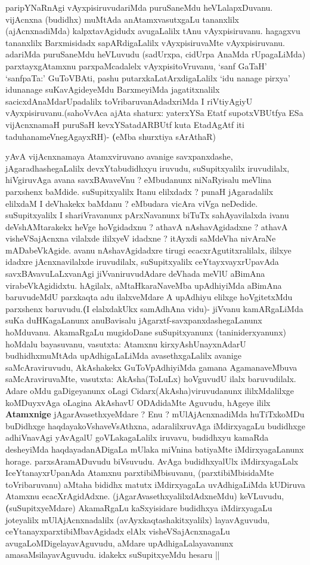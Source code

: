 \begin{artha}
paripYNaRnAgi vAyxpisiruvudariMda puruSaneMdu
heVLalapxDuvanu. vijAcnxna (budidhx) muMtAda anAtamxvasutxgaLu
tananxlilx (ajAcnxnadiMda) kalpxtavAgidudx avugaLalilx tAnu
vAyxpisiruvanu. hagagxvu tananxlilx Barxmisidadx sapARdigaLalilx
vAyxpisiruvaMte vAyxpisiruvanu. adariMda puruSaneMdu heVLuvudu
(sadUrxpa, cidUrpa AnaMda rUpagaLiMda) parxtayxgAtamxnu
parxpaMcadalelx vAyxpisitoVruvanu, `sanf GaTaH' `sanfpaTa:' GuToVBAti,
pashu putarxkaLatArxdigaLalilx `idu nanage pirxya' idunanage
suKavAgideyeMdu BarxmeyiMda jagatitxnalilx sacicxdAnaMdarUpadalilx
toVribaruvanAdadxriMda I riVtiyAgiyU vAyxpisiruvanu.(sahoVvAca ajAta
shaturx: yaterxYSa Etatf supotxV\s BUtfya ESa vijAcnxnamaH puruSaH
kevxYSatadARBUtf kuta EtadAgAtf iti taduhanameVnegAgayxRH)-
\textbf(eMba shurxtiya sArAthaR)
\end{artha}

\begin{artha}
yAvA vijAcnxnamaya Atamxviruvano avanige savxpanxdashe,
jAgaradhashegaLalilx devxYtabudidhxyu iruvudu, suSupitxyalilx
iruvudilalx, hiVgiruvAga avana savxBAvaveVnu ? eMbudanunx niNaRyisalu
meVlina parxshenx baMdide. suSupitxyalilx Itanu elilxdadx ? punaH
jAgaradalilx elilxdaM I deVhakekx baMdanu ? eMbudara vicAra viVga
neDedide. suSupitxyalilx I shariVravanunx pArxNavanunx biTuTx
sahAyavilalxda ivanu deVshAMtarakekx heVge hoVgidadxnu ? athavA
nAshavAgidadxne ? athavA visheVSajAcnxna vilalxde ililxyeV idadxne ?
itAyxdi saMdeVha nivAraNe mADabeVkAgide. avanu nAshavAgidadxre tirugi
ecacxrAgutitxralilalx, ililxye idadxre jAcnxnavilalxde iruvudilalx,
suSupitxyalilx ceYtayxvayxrUpavAda savxBAvavuLaLxvanAgi
jiVvaniruvudAdare deVhada meVlU aBimAna virabeVkAgididxtu. hAgilalx,
aMtaHkaraNaveMba upAdhiyiMda aBimAna baruvudeMdU parxkaqta adu
ilalxveMdare  A upAdhiyu elilxge hoVgitetxMdu parxshenx
baruvudu.\textbf(I elalxdakUkx samAdhAna vidu)- jiVvanu kamARgaLiMda
suKa duHKagaLanunx anuBavisalu jAgarxtf-savxpanxdashegaLanunx
hoMduvanu. AkamaRgaLu mugidoDane suSupitxyanunx (taniniderxyanunx)
hoMdalu bayasuvanu, vasutxta: Atamxnu kirxyAshUnayxnAdarU
budhidhxmuMtAda upAdhigaLaLiMda avasethxgaLalilx avanige
saMcAraviruvudu, AkAshakekx GuToVpAdhiyiMda gamana AgamanaveMbuva
saMcAraviruvaMte, vasutxta: AkAsha(ToLuLx) hoVguvudU ilalx
baruvudilalx. Adare oMdu gaDigeyanunx oLagi Cidarx(AkAsha)viruvudanunx
ililxMdalilxge koMDuyxvAga oLagina AkAshavU ODAdidaMte Aguvudu, hAgeye
ililx \textbf{Atamxnige} jAgarAvasethxyeMdare ? Enu ? mUlAjAcnxnadiMda
huTiTxkoMDu buDidhxge haqdayakoVshaveVsAthxna, adaralilxruvAga
iMdirxyagaLu budidhxge adhiVnavAgi yAvAgalU goVLakagaLalilx iruvavu,
budidhxyu kamaRda desheyiMda haqdayadanADigaLa mUlaka miVnina
batiyaMte iMdirxyagaLanunx horage. parxsAramADuvudu biVsuvudu. AvAga
budidhxyalUlx iMdirxyagaLalx IceYtanayxrUpanAda Atamxnu
parxtibiMbisuvanu, (parxtibiMbisidaMte toVribaruvanu) aMtaha bididhx
matutx iMdirxyagaLa uvAdhigaLiMda kUDiruva Atamxnu
ecacXrAgidAdxne. (jAgarAvasethxyalilxdAdxneMdu) keVLuvudu,
\textbf(suSupitxyeMdare) AkamaRgaLu kaSxyisidare budidhxya
iMdirxyagaLu joteyalilx mUlAjAcnxnadalilx (avAyxkaqtashakitxyalilx)
layavAguvudu, ceYtanayxparxtibiMbavAgidadx elAlx visheVSajAcnxnagaLu
avugaLoMDigelayavAguvudu, aMdare upAdhigaLalayavanunx
amasaMsilayavAguvudu. idakekx suSupitxyeMdu hesaru || 
\end{artha}

